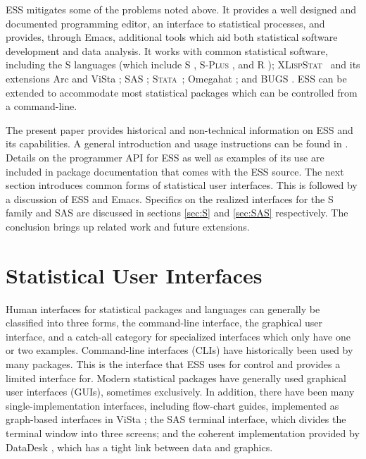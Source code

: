 \documentclass{article}
\newcommand*{\Splus}{\textsc{S-Plus}}
\newcommand*{\XLispStat}{\textsc{XLispStat}}
\newcommand*{\Stata}{\textsc{Stata}}
\begin{document}
ESS mitigates some of the problems noted above.  It provides a well
designed and documented programming editor, an interface to
statistical processes, and provides, through Emacs, additional tools
which aid both statistical software development and data analysis.  It
works with common statistical software, including the S languages
(which include S \citep{BecRCW88,ChaJH92,ChaJ98}, \Splus{}
\citep{Splus}, and R \citep{ihak:gent:1996}); \XLispStat\
\citep{Tier90} and its extensions Arc \citep{Cook:Weisberg:1999} and
ViSta \citep{youn:fald:mcfa:1992}; SAS \citep{SAS:8.0}; \Stata\
\citep{Stata:6.0}; Omegahat \citep{DTLang:2000}; and BUGS
\citep{SpieThomBest:1999}.  ESS can be extended to accommodate most
statistical packages which can be controlled from a command-line.

The present paper provides historical and non-technical information on
ESS and its capabilities.  A general introduction and usage
instructions can be found in \cite{heiberger:dsc:2001}.  Details on
the programmer API for ESS as well as examples of its use are included
in package documentation that comes with the ESS source.  The next
section introduces common forms of statistical user interfaces.  This
is followed by a discussion of ESS and Emacs.  Specifics on the
realized interfaces for the S family and SAS are discussed in sections
\ref{sec:S} and \ref{sec:SAS} respectively.  The conclusion brings up
related work and future extensions.

\section{Statistical User Interfaces}
\label{sec:UI}

Human interfaces for statistical packages and languages can generally
be classified into three forms, the command-line interface, the
graphical user interface, and a catch-all category for specialized
interfaces which only have one or two examples.  Command-line
interfaces (CLIs) have historically been used by many packages.  This
is the interface that ESS uses for control and provides a limited
interface for.  Modern statistical packages have generally used
graphical user interfaces (GUIs), sometimes exclusively.  In addition,
there have been many single-implementation interfaces, including
flow-chart guides, implemented as graph-based interfaces in ViSta
\citep{youn:lubi:1995}; the SAS terminal interface, which divides the
terminal window into three screens; and the coherent implementation
provided by DataDesk \citep{vell:prat:1989}, which has a tight link
between data and graphics.
\end{document}

